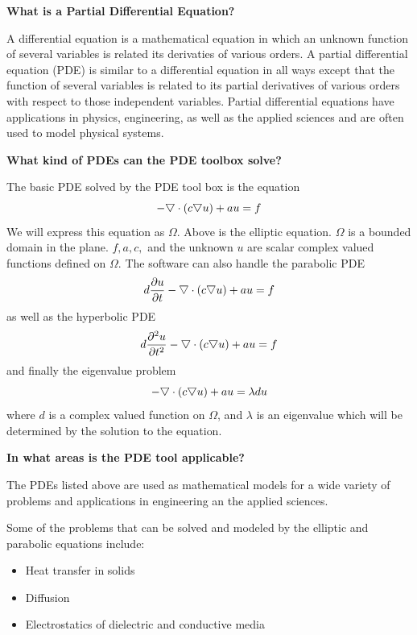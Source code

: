 \documentclass{amsart}
\theoremstyle{definition}
\begin{document}
\Large
\noindent
\textbf{What is a Partial Differential Equation?} \par
\normalsize
A differential equation is a mathematical equation in which an unknown function of several variables is related its derivaties of various orders. A partial differential equation (PDE) is similar to a differential equation in all ways except that the function of several variables is related to its partial derivatives of various orders with respect to those independent variables. Partial differential equations have applications in physics, engineering, as well as the applied sciences and are often used to model physical systems.
\par
\bigskip
\noindent
\Large
\textbf{What kind of PDEs can the PDE toolbox solve?} \par
\normalsize
The basic PDE solved by the PDE tool box is the equation
\begin{equation}
-\raisebox{.4ex}{$\bigtriangledown$} \cdot (c \raisebox{.4ex}{$\bigtriangledown$} u) + a u = f   \label{E:ellip} 
\end{equation}
We will express this equation as $\Omega$. Above is the elliptic equation. $\Omega$ is a bounded domain in the plane. $f, a, c,$ and the unknown $u$ are scalar complex valued functions defined on $\Omega$. The software can also handle the parabolic PDE
\begin{equation}
d \frac{\partial u}{\partial t} -\raisebox{.4ex}{$\bigtriangledown$} \cdot (c \raisebox{.4ex}{$\bigtriangledown$} u) + a u = f   \label{E:par}
\end{equation}
as well as the hyperbolic PDE
\begin{equation}
d \frac{\partial ^2 u}{\partial t^2} -\raisebox{.4ex}{$\bigtriangledown$} \cdot (c \raisebox{.4ex}{$\bigtriangledown$} u) + a u = f
\end{equation}
and finally the eigenvalue problem
\begin{equation}
-\raisebox{.4ex}{$\bigtriangledown$} \cdot (c \raisebox{.4ex}{$\bigtriangledown$} u) + a u = \lambda d u
\end{equation}
where $d$ is a complex valued function on $\Omega$, and $\lambda$ is an eigenvalue which will be determined by the solution to the equation. 

\par
\bigskip
\noindent
\Large
\textbf{In what areas is the PDE tool applicable?} \par
\normalsize
The PDEs listed above are used as mathematical models for a wide variety of problems and applications in engineering an the applied sciences. \par 
Some of the problems that can be solved and modeled by the elliptic and parabolic equations include:
\begin{itemize}
\item Heat transfer in solids
\item Diffusion
\item Electrostatics of dielectric and conductive media
\end{itemize}
\end{document}
